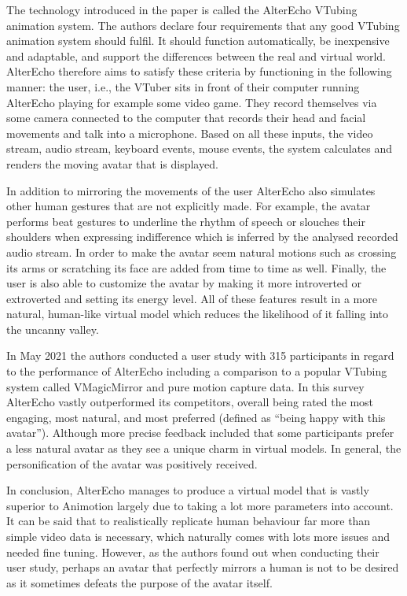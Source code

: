 The technology introduced in the paper is called the AlterEcho VTubing animation system. The authors declare four requirements that any good VTubing animation system should
fulfil. It should function automatically, be inexpensive and adaptable, and support the differences between the real and virtual world. AlterEcho therefore aims to satisfy
these criteria by functioning in the following manner: the user, i.e., the VTuber sits in front of their computer running AlterEcho playing for example some video game. They
record themselves via some camera connected to the computer that records their head and facial movements and talk into a microphone. Based on all these inputs, the video
stream, audio stream, keyboard events, mouse events, the system calculates and renders the moving avatar that is displayed.

In addition to mirroring the movements of the user AlterEcho also simulates other human gestures that are not explicitly made. For example, the avatar performs beat gestures to
underline the rhythm of speech or slouches their shoulders when expressing indifference which is inferred by the analysed recorded audio stream. In order to make the avatar seem
natural motions such as crossing its arms or scratching its face are added from time to time as well. Finally, the user is also able to customize the avatar by making it more
introverted or extroverted and setting its energy level. All of these features result in a more natural, human-like virtual model which reduces the likelihood of it falling into
the uncanny valley.

In May 2021 the authors conducted a user study with 315 participants in regard to the performance of AlterEcho including a comparison to a popular VTubing system called VMagicMirror
and pure motion capture data. In this survey AlterEcho vastly outperformed its competitors, overall being rated the most engaging, most natural, and most preferred (defined as
“being happy with this avatar”). Although more precise feedback included that some participants prefer a less natural avatar as they see a unique charm in virtual models.
In general, the personification of the avatar was positively received.

In conclusion, AlterEcho manages to produce a virtual model that is vastly superior to Animotion largely due to taking a lot more parameters into account. It can be said that to
realistically replicate human behaviour far more than simple video data is necessary, which naturally comes with lots more issues and needed fine tuning. However, as the authors
found out when conducting their user study, perhaps an avatar that perfectly mirrors a human is not to be desired as it sometimes defeats the purpose of the avatar itself.

